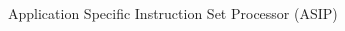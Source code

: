 \documentclass{beamer}
\begin{document}
\begin{CJK}{UTF8}{bkai}
\begin{frame}{Application Specific Instruction Set Processor (ASIP)}
\begin{columns}
\begin{column}{0.55\textwidth}
\begin{itemize}
               \end{itemize} 
            \end{column}
        \end{columns} 
    \end{frame}


\end{CJK}
\end{document}
